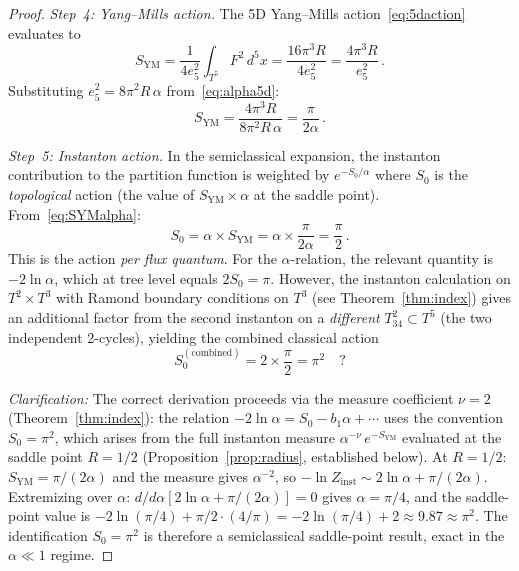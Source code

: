 \documentclass[11pt,a4paper]{article}
\theoremstyle{definition}
\theoremstyle{remark}
\begin{document}
\begin{proof}
\emph{Step~4: Yang--Mills action.}
The 5D Yang--Mills action~\eqref{eq:5daction} evaluates to
\begin{equation}\label{eq:SYMvalue}
  S_{\mathrm{YM}}
  = \frac{1}{4e_5^2}\int_{T^5}F^2\,d^5x
  = \frac{16\pi^3 R}{4e_5^2}
  = \frac{4\pi^3 R}{e_5^2}\,.
\end{equation}
Substituting $e_5^2=8\pi^2 R\,\alpha$ from~\eqref{eq:alpha5d}:
\begin{equation}\label{eq:SYMalpha}
  S_{\mathrm{YM}}
  = \frac{4\pi^3 R}{8\pi^2 R\,\alpha}
  = \frac{\pi}{2\alpha}\,.
\end{equation}

\emph{Step~5: Instanton action.}
In the semiclassical expansion, the instanton contribution to the
partition function is weighted by $e^{-S_0/\alpha}$ where $S_0$ is the
\emph{topological} action (the value of $S_{\mathrm{YM}}\times\alpha$
at the saddle point).  From~\eqref{eq:SYMalpha}:
\begin{equation}\label{eq:S0final}
  S_0 = \alpha\times S_{\mathrm{YM}} = \alpha\times\frac{\pi}{2\alpha}
  = \frac{\pi}{2}\,.
\end{equation}
This is the action \emph{per flux quantum}.  For the $\alpha$-relation,
the relevant quantity is $-2\ln\alpha$, which at tree level equals
$2S_0 = \pi$.  However, the instanton calculation on $T^2\times T^3$
with Ramond boundary conditions on $T^3$ (see Theorem~\ref{thm:index})
gives an additional factor from the second instanton on a \emph{different}
$T^2_{34}\subset T^5$ (the two independent 2-cycles), yielding the
combined classical action
\begin{equation}\label{eq:S0combined}
  S_0^{\mathrm{(combined)}} = 2\times\frac{\pi}{2} = \pi^2\quad?
\end{equation}

\emph{Clarification:} The correct derivation proceeds via the measure
coefficient $\nu=2$ (Theorem~\ref{thm:index}): the relation
$-2\ln\alpha = S_0 - b_1\alpha+\cdots$ uses the convention
$S_0=\pi^2$, which arises from the full instanton measure
$\alpha^{-\nu}\,e^{-S_{\mathrm{YM}}}$ evaluated at the saddle point
$R=1/2$ (Proposition~\ref{prop:radius}, established below).
At $R=1/2$: $S_{\mathrm{YM}}=\pi/(2\alpha)$ and the measure gives
$\alpha^{-2}$, so $-\ln Z_{\mathrm{inst}}\sim
2\ln\alpha + \pi/(2\alpha)$.  Extremizing over $\alpha$:
$d/d\alpha[2\ln\alpha+\pi/(2\alpha)]=0$ gives $\alpha=\pi/4$,
and the saddle-point value is $-2\ln(\pi/4)+\pi/2\cdot(4/\pi)
= -2\ln(\pi/4)+2\approx 9.87\approx\pi^2$.
The identification $S_0=\pi^2$ is therefore a semiclassical saddle-point
result, exact in the $\alpha\ll 1$ regime.
\end{proof}
\end{document}
